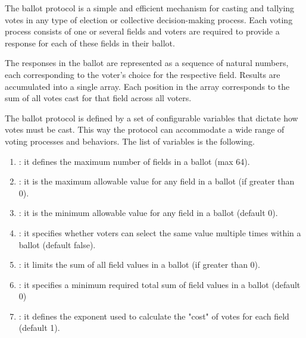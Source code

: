 




The \davinci ballot protocol is a simple and efficient mechanism for casting and tallying votes in any type of election or collective decision-making process. Each voting process consists of one or several fields and voters are required to provide a response for each of these fields in their ballot.

The responses in the ballot are represented as a sequence of natural numbers, each corresponding to the voter’s choice for the respective field. Results are accumulated into a single array. Each position in the array corresponds to the sum of all votes cast for that field across all voters.

The ballot protocol is defined by a set of configurable variables that dictate how votes must be cast. This way the protocol can accommodate a wide range of voting processes and behaviors. The list of variables is the following.

\begin{enumerate}
	\item \maxcount: it defines the maximum number of fields in a ballot (max 64).
	\item \maxvalue: it is the maximum allowable value for any field in a ballot (if greater than 0).
	\item \minvalue: it is the minimum allowable value for any field in a ballot (default 0).
	\item \uniquevalues: it specifies whether voters can select the same value multiple times within a ballot (default false).
	\item \maxtotalcost: it limits the sum of all field values in a ballot (if greater than 0).
	\item \mintotalcost: it specifies a minimum required total sum of field values in a ballot (default 0)
	\item \costexponent: it defines the exponent used to calculate the "cost" of votes for each field (default 1).
\end{enumerate}

